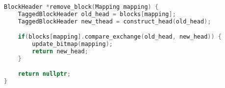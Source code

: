 \begin{lstlisting}[language=C++, caption={Concurrent removal of the head of a free-list.}, label={algorithm:concurrent_remove_block}]
BlockHeader *remove_block(Mapping mapping) {
    TaggedBlockHeader old_head = blocks[mapping];
    TaggedBlockHeader new_thead = construct_head(old_head);

    if(blocks[mapping].compare_exchange(old_head, new_head)) {
        update_bitmap(mapping);
        return new_head;
    }

    return nullptr;
}
\end{lstlisting}

